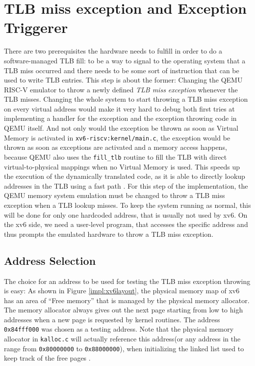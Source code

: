 \section{TLB miss exception and Exception Triggerer }
There are two prerequisites the hardware needs to fulfill in order to do a software-managed TLB fill:
to be a way to signal to the operating system that a TLB miss occurred and there needs to be some
sort of instruction that can be used to write TLB entries.
This step is about the former: Changing the QEMU RISC-V emulator to throw a newly defined \textit{
    TLB miss exception} whenever the TLB misses.
Changing the whole system to start throwing a TLB miss exception on every virtual address would
make it very hard to debug both first tries at implementing a handler for the exception and the
exception throwing code in QEMU itself.
And not only would the exception be thrown as soon as Virtual Memory is activated in
\texttt{xv6-riscv:kernel/main.c}, the exception would be thrown
as soon as exceptions are activated and a memory access happens, because QEMU also uses the
\texttt{fill\_tlb} routine to fill the TLB with direct
virtual-to-physical mappings when no Virtual Memory is used. This speeds up the execution of
the dynamically translated code, as it is able to directly
lookup addresses in the TLB using a fast path \cite{DeepDiveQEMU}.
For this step of the implementation, the QEMU memory system emulation must be changed to throw a
TLB miss exception when a TLB lookup misses. To keep the system running as normal, this will
be done for only one hardcoded address, that is usually not used by xv6.
On the xv6 side, we need a user-level program, that accesses the specific address and thus prompts
the emulated hardware to throw a TLB miss exception.


\subsection{Address Selection}
The choice for an address to be used for testing the TLB miss exception throwing is easy:
As shown in Figure \ref{impl:xv6layout}, the physical memory map of xv6 has an
area of ``Free memory'' that is managed by the physical memory allocator. The memory allocator
always gives out the next page starting from low to high addresses when a new page is requested
by kernel routines. The address \texttt{0x84fff000} was chosen as a testing address.
Note that the physical memory allocator in \texttt{kalloc.c} will actually reference this address(or
any address in the range from \texttt{0x80000000} to \texttt{0x88000000}), when initializing
the linked list used to keep track of the free pages \cite{cox2011xv6}.

